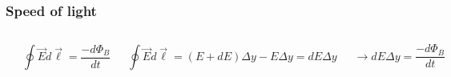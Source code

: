\documentclass[]{beamer}
\begin{document}


\begin{frame}

\frametitle{Speed of light}



   \begin{columns}[c]
   \column{2in}  %
  

 \begin{center}
  \includegraphics[height=1.4in]{images5/EMwave2.jpg}
\end{center}


   \column{2.5in}
\pause


\begin{equation*}
\oint \vec{E}d\vec{\ell}=\frac{-d\Phi_B}{dt}
\end{equation*}

\pause 

\begin{equation*}
\oint \vec{E}d\vec{\ell}=(E+dE)\Delta y-E\Delta y=dE\Delta y
\end{equation*}
\pause

\begin{equation*}
\rightarrow dE\Delta y=\frac{-d\Phi_B}{dt}
\end{equation*}


   \end{columns}




  \end{frame}











\end{document}
